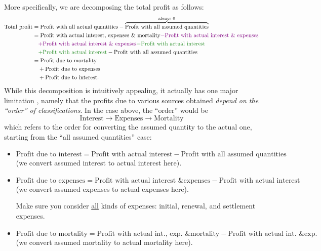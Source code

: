 \begin{enumerate}
More specifically, we are decomposing the total profit as follows:
\begin{align*}
\text{Total profit}&=\text{Profit with all actual quantities}-\overbrace{\text{Profit with all assumed quantities}}^{\text{always \(0\)}} \\
&=\text{Profit with actual interest, expenses \& mortality}\vc{-\text{Profit with actual interest \& expenses}} \\
&\quad\vc{+\text{Profit with actual interest \& expenses}}\gc{-\text{Profit with actual interest}} \\
&\quad\gc{+\text{Profit with actual interest}}-\text{Profit with all assumed quantities} \\
&=\text{Profit due to mortality} \\
&\quad+\text{Profit due to expenses} \\
&\quad+\text{Profit due to interest}.
\end{align*}
While this decomposition is intuitively appealing, it actually has one major
limitation \warn{}, namely that the profits due to various sources obtained
\emph{depend on the ``order'' of classifications}. In the case above, the
``order'' would be
\[
\text{Interest}\to\text{Expenses}\to\text{Mortality}
\]
which refers to the order for converting the assumed quantity to the actual
one, starting from the ``all assumed quantities'' case:
\begin{itemize}
\item \(\text{Profit due to interest}=\text{Profit with actual interest}-\text{Profit with all assumed quantities}\) \\
(we convert assumed interest to actual interest here).
\item \(\text{Profit due to expenses}=\text{Profit with actual interest \& expenses}
-\text{Profit with actual interest}\) \\
(we convert assumed expenses to actual expenses here).
\begin{warning}
Make sure you consider \underline{all} kinds of expenses: initial, renewal, and
settlement expenses.
\end{warning}
\item \(\text{Profit due to mortality}=\text{Profit with actual int., exp. \& mortality}
-\text{Profit with actual int. \& exp.}\) \\
(we convert assumed mortality to actual mortality here).
\end{itemize}


\end{enumerate}
